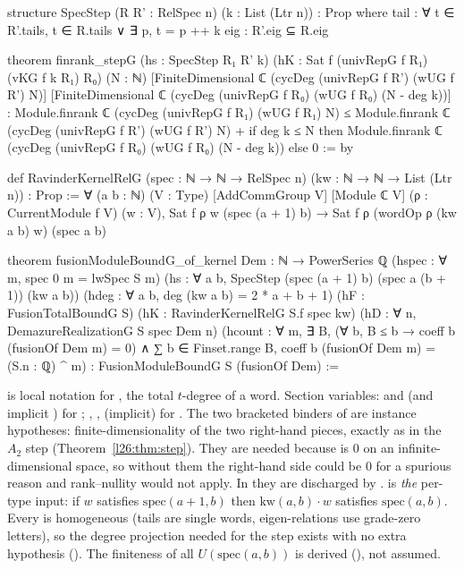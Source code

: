 \begin{leancode}
structure SpecStep (R R' : RelSpec n) (k : List (Ltr n)) : Prop where
  tail : ∀ t ∈ R'.tails, t ∈ R.tails ∨ ∃ p, t = p ++ k
  eig : R'.eig ⊆ R.eig

theorem finrank_stepG (hs : SpecStep R₁ R' k) (hK : Sat f (univRepG f R₁) (vKG f k R₁) R₀)
    (N : ℕ) [FiniteDimensional ℂ (cycDeg (univRepG f R') (wUG f R') N)]
    [FiniteDimensional ℂ (cycDeg (univRepG f R₀) (wUG f R₀) (N - deg k))] :
    Module.finrank ℂ (cycDeg (univRepG f R₁) (wUG f R₁) N) ≤
      Module.finrank ℂ (cycDeg (univRepG f R') (wUG f R') N) +
        if deg k ≤ N then
          Module.finrank ℂ (cycDeg (univRepG f R₀) (wUG f R₀) (N - deg k)) else 0 := by

def RavinderKernelRelG (spec : ℕ → ℕ → RelSpec n) (kw : ℕ → ℕ → List (Ltr n)) : Prop :=
  ∀ (a b : ℕ) (V : Type) [AddCommGroup V] [Module ℂ V] (ρ : CurrentModule f V) (w : V),
    Sat f ρ w (spec (a + 1) b) → Sat f ρ (wordOp ρ (kw a b) w) (spec a b)

theorem fusionModuleBoundG_of_kernel {Dem : ℕ → PowerSeries ℚ}
    (hspec : ∀ m, spec 0 m = lwSpec S m)
    (hs : ∀ a b, SpecStep (spec (a + 1) b) (spec a (b + 1)) (kw a b))
    (hdeg : ∀ a b, deg (kw a b) = 2 * a + b + 1)
    (hF : FusionTotalBoundG S) (hK : RavinderKernelRelG S.f spec kw)
    (hD : ∀ n, DemazureRealizationG S spec Dem n)
    (hcount : ∀ m, ∃ B, (∀ b, B ≤ b → coeff b (fusionOf Dem m) = 0) ∧
      ∑ b ∈ Finset.range B, coeff b (fusionOf Dem m) = (S.n : ℚ) ^ m) :
    FusionModuleBoundG S (fusionOf Dem) :=
\end{leancode}

\begin{dictionary}
 is local notation for , the total $t$-degree of a word. Section variables:
 and  (and implicit ) for ; , ,  (implicit) for
. The two bracketed \lean{[FiniteDimensional ...]} binders of  are
instance hypotheses: finite-dimensionality of the two right-hand pieces, exactly as in the $A_2$ step (Theorem~\ref{l26:thm:step}).
They are needed because  is $0$ on an infinite-dimensional space, so without them the right-hand side
could be $0$ for a spurious reason and rank--nullity would not apply. In  they are discharged
by .  is \emph{the} per-type input: if $w$ satisfies
$\mathrm{spec}(a+1,b)$ then $\mathrm{kw}(a,b)\cdot w$ satisfies $\mathrm{spec}(a,b)$. Every  is homogeneous (tails are
single words, eigen-relations use grade-zero letters), so the degree projection needed for the step exists with no extra
hypothesis (). The finiteness of all $U(\mathrm{spec}(a,b))$ is derived (), not assumed.
\end{dictionary}


